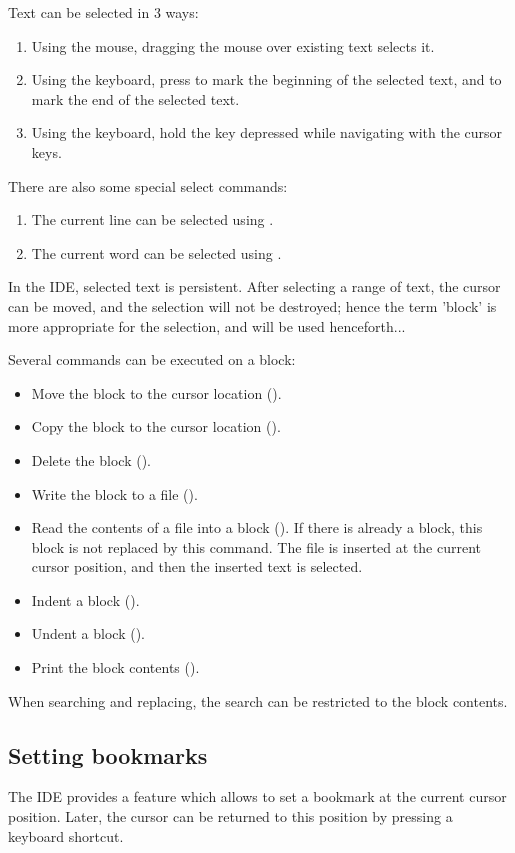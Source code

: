Text can be selected in 3 ways:
\begin{enumerate}
\item Using the mouse, dragging the mouse over existing text selects it.
\item Using the keyboard, press  to mark the beginning of
the selected text, and  to mark the end of the selected
text.
\item Using the keyboard, hold the  key depressed while
navigating with the cursor keys.
\end{enumerate}

There are also some special select commands:
\begin{enumerate}
\item The current line can be selected using .
\item The current word can be selected using .
\end{enumerate}

In the \fpc IDE, selected text is persistent. After selecting a range of
text, the cursor can be moved, and the selection will not be destroyed;
hence the term 'block' is more appropriate for the selection, and will be
used henceforth...

Several commands can be executed on a block:
\begin{itemize}
\item Move the block to the cursor location ().
\item Copy the block to the cursor location ().
\item Delete the block ().
\item Write the block to a file ().
\item Read the contents of a file into a block ().
If there is already a block, this block is not replaced by this command.
The file is inserted at the current cursor position, and then the
inserted text is selected.
\item Indent a block ().
\item Undent a block ().
\item Print the block contents ().
\end{itemize}
When searching and replacing, the search can be restricted to the block
contents.

%
%
\subsection{Setting bookmarks}
\label{se:bookmarks}
The IDE provides a feature which allows to set a bookmark at the current
cursor position. Later, the cursor can be returned to this position
by pressing a keyboard shortcut.

